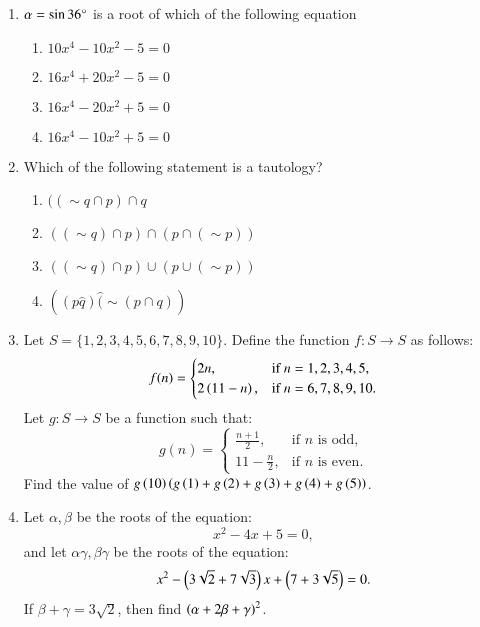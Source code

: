 \documentclass[journal,12pt,twocolumn]{IEEEtran}
\theoremstyle{remark}
\begin{document}
\begin{enumerate}
    \item $\alpha = \sin 36\degree$ is a root of which of the following equation
    \begin{multicols}{2}
    \begin{enumerate}
        \item $10x^4 - 10x^2 -5 = 0$
        \item $16x^4 + 20x^2 -5 = 0$
        \item $16x^4 - 20x^2 +5 = 0$
        \item $16x^4 - 10x^2 +5 = 0$
    \end{enumerate}
    \end{multicols}

    \item Which of the following statement is a tautology?
    \begin{multicols}{2}
    \begin{enumerate}
        \item $((\sim q \cap p)\cap q $
        \item $((\sim q) \cap p) \cap (p \cap (\sim p))$
        \item $((\sim q) \cap p) \cup (p \cup (\sim p))$
        \item $((p \hat q) \hat (\sim(p \cap q))$
    \end{enumerate}
    \end{multicols}

    
    \item Let $ S = \{1, 2, 3, 4, 5, 6, 7, 8, 9, 10\} $. Define the function $ f: S \to S $ as follows:
    \[
    f(n) = 
    \begin{cases}
    2n, & \text{if } n = 1, 2, 3, 4, 5, \\
    2\left(11 - n\right), & \text{if } n = 6, 7, 8, 9, 10.
    \end{cases}
    \]
    Let $ g: S \to S $ be a function such that:
    \[
    g(n) =
    \begin{cases}
    \frac{n+1}{2}, & \text{if } n \text{ is odd}, \\
    11 - \frac{n}{2}, & \text{if } n \text{ is even}.
    \end{cases}
    \]
    Find the value of $ g\left(10\right) \left( g\left(1\right) + g\left(2\right) + g\left(3\right) + g\left(4\right) + g\left(5\right) \right) $.

    \item Let $ \alpha, \beta $ be the roots of the equation:
    \[
    x^2 - 4x + 5 = 0,
    \]
    and let $ \alpha \gamma, \beta \gamma $ be the roots of the equation:
    \[
    x^2 - \left(3\sqrt{2} + 7\sqrt{3}\right)x + \left(7 + 3\sqrt{5}\right) = 0.
    \]
    If $ \beta + \gamma = 3\sqrt{2} $, then find $ \left(\alpha + 2\beta + \gamma\right)^2 $.


\end{enumerate}
\end{document}
